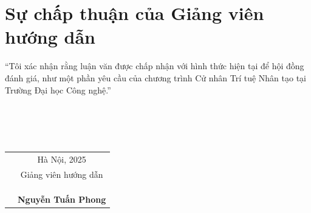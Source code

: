 \chapter*{Sự chấp thuận của Giảng viên hướng dẫn}


“Tôi xác nhận rằng luận văn được chấp nhận với hình thức hiện tại để hội đồng đánh giá, như một phần yêu cầu của chương trình Cử nhân Trí tuệ Nhân tạo tại Trường Đại học Công nghệ.”
\\
\\
\\
\\
\\
\begin{table}[!ht]
\begin{tabular}{p{}c}
 & Hà Nội, 2025 \\
 & Giảng viên hướng dẫn \\
 &              \\
 &              \\
 &              \\
 & \textbf{Nguyễn Tuấn Phong} 
\end{tabular}
\end{table}
